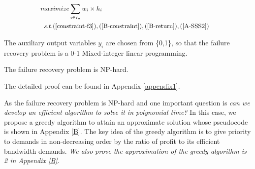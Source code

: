 \documentclass[sigconf]{acmart}
\begin{document}
\begin{equation}
\small
\begin{aligned} \label{BATE-recovery}
 &maximize  \sum_{i\in I_a} w_i\times h_i\\
&\begin{array}{r@{\quad}r@{}l@{\quad}l}
s.t.  (\ref{constraint-f3}), (\ref{B-constraint}), (\ref{B-return}), (\ref{A-SSS2})
\end{array}
\end{aligned}
\end{equation}


The auxiliary output variables $y_i$ are chosen from \{0,1\},  so that the  failure recovery problem is a 0-1 Mixed-integer linear programming.

\begin{lemma}\label{NP-hard}
The failure recovery problem is NP-hard.
\end{lemma}
The detailed proof can be found in Appendix \ref{appendix1}.



As the failure recovery problem is NP-hard and one important question is \textit{can we develop an efficient algorithm to solve it in polynomial time?} 
In this case,  we propose a greedy algorithm to attain an approximate solution whose pseudocode is shown in Appendix \ref{B}.
The key idea of the greedy algorithm is to give priority to demands in non-decreasing order by the ratio of profit to its efficient bandwidth demands.
\textit{We also prove the approximation of the greedy algorithm is 2  in Appendix \ref{B}}. 
\end{document}
